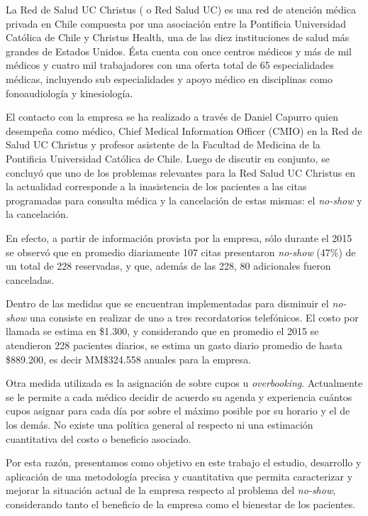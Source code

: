 La Red de Salud UC Christus ( o Red Salud UC) es una red de atención médica privada en Chile compuesta por una asociación entre la Pontificia Universidad Católica de Chile y Christus Health, una de las diez instituciones de salud más grandes de Estados Unidos. Ésta cuenta con once centros médicos y más de mil médicos y cuatro mil trabajadores \cite{saluducAbout} con una oferta total de 65 especialidades médicas, incluyendo sub especialidades y apoyo médico en disciplinas como fonoaudiología y kinesiología.

El contacto con la empresa se ha realizado a través de Daniel Capurro quien desempeña como médico, Chief Medical Information Officer (CMIO) en la Red de Salud UC Christus y profesor asistente de la Facultad de Medicina de la Pontificia Universidad Católica de Chile. Luego de discutir en conjunto, se concluyó que uno de los problemas relevantes para la Red Salud UC Christus en la actualidad corresponde a la inasistencia de los pacientes a las citas programadas para consulta médica y la cancelación de estas mismas: el \textit{no-show} y la cancelación.

En efecto, a partir de información provista por la empresa, sólo durante el 2015 se observó que en promedio diariamente 107 citas presentaron \textit{no-show} (47\%) de un total de 228 reservadas, y que, además de las 228, 80 adicionales fueron canceladas.

Dentro de las medidas que se encuentran implementadas para disminuir el \textit{no-show} una consiste en realizar de uno a tres recordatorios telefónicos. El costo por llamada se estima en \$1.300, y considerando que en promedio el 2015 se atendieron 228 pacientes diarios, se estima un gasto diario promedio de hasta \$889.200, es decir MM\$324.558 anuales para la empresa.

Otra medida utilizada es la asignación de sobre cupos u \textit{overbooking}. Actualmente se le permite a cada médico decidir de acuerdo su agenda y experiencia cuántos cupos asignar para cada día por sobre el máximo posible por su horario y el de los demás. No existe una política general al respecto ni una estimación cuantitativa del costo o beneficio asociado.

Por esta razón, presentamos como objetivo en este trabajo el estudio, desarrollo y aplicación de una metodología precisa y cuantitativa que permita caracterizar y mejorar la situación actual de la empresa respecto al problema del \textit{no-show}, considerando tanto el beneficio de la empresa como el bienestar de los pacientes.
